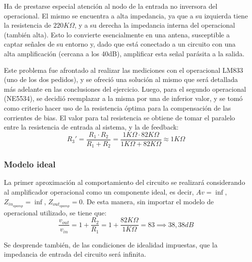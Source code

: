 Ha de prestarse especial atención al nodo de la entrada no inversora del operacional.
El mismo se encuentra a alta impedancia, ya que a su izquierda tiene la resistencia de $220K\Omega$, y a su derecha la impedancia interna del operacional (también alta).
Esto lo convierte esencialmente en una antena, susceptible a captar señales de su entorno y, dado que está conectado a un circuito con una alta amplificación (cercana a los 40dB), amplificar esta señal parásita a la salida.\par
Este problema fue afrontado al realizar las mediciones con el operacional LM833 (uno de los dos pedidos), y se ofreció una solución al mismo que será detallada más adelante en las conclusiones del ejercicio.
Luego, para el segundo operacional (NE5534), se decidió reemplazar a la misma por una de inferior valor, y se tomó como criterio hacer uso de la resistencia óptima para la compensación de las corrientes de bias.
El valor para tal resistencia se obtiene de tomar el paralelo entre la resistencia de entrada al sistema, y la de feedback:
\begin{equation}
    R_3' = \frac{R_1 \cdot R_2}{R_1 + R_2} = \frac{1K\Omega \cdot 82K\Omega}{1K\Omega + 82K\Omega} \approx 1K\Omega
\end{equation}

\subsubsection{Modelo ideal}
La primer aproximación al comportamiento del circuito se realizará considerando al amplificador operacional como un componente ideal, es decir, $Av = \inf$, $Z_{in_{opamp}} = \inf$, $Z_{out_{opamp}} = 0$.
De esta manera, sin importar el modelo de operacional utilizado, se tiene que:
\begin{equation}
    \label{eq:ideal_gain}
    \frac{v_{out}}{v_{in}} = 1 + \frac{R_2}{R_1} = 1 + \frac{82 K\Omega}{1 K\Omega} = 83 \implies 38,38 dB
\end{equation}

Se desprende también, de las condiciones de idealidad impuestas, que la impedancia de entrada del circuito será infinita.


